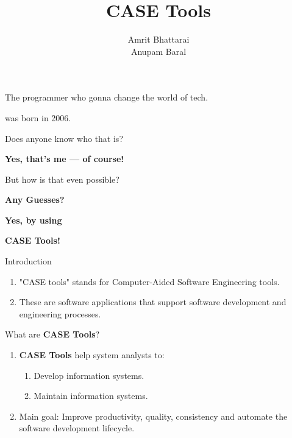 \documentclass[14pt, aspectratio=169]{beamer}
\title{CASE Tools}
\author{Amrit Bhattarai\\Anupam Baral}
\begin{document}
\maketitle

\begin{frame}[plain]{}
	\vfill
	\centering
	{\Huge The programmer who gonna change the world of tech.} \par \pause
	\vspace{1em}
	{\LARGE was born in \textcolor{alert}{2006}.} \par \pause
	\vspace{1em}
	{\large Does anyone know who that is?} \par \pause
	\vspace{1em}
	{\Huge \textbf{Yes, that’s me — of course!}}
	\vfill
\end{frame}

\begin{frame}[plain]{}
	\vfill
	\centering
	{\Huge But how is that even possible?} \par \pause
	\vspace{2em}
	{\Huge \textbf{Any Guesses?}}
	\vfill
\end{frame}

\begin{frame}[plain]{}
	\vfill
	\centering
	{\Huge \textbf{Yes, by using}} \par
	\vspace{1em}
	{\Huge \textbf{\textcolor{alert}{CASE Tools!}}}
	\vfill
\end{frame}

\begin{frame}{Introduction}
	\begin{enumerate}
		\item<1-> "CASE tools" stands for \textcolor{alert}{Computer-Aided Software Engineering} tools. \pause
		\item<2-> These are software applications that support software development and engineering processes.
	\end{enumerate}
\end{frame}


\begin{frame}{What are \textbf{CASE Tools}?}
	\begin{enumerate}
		\item<1-> \textbf{CASE Tools} help system analysts to: \pause
			\begin{enumerate}
				\item Develop information systems.
				\item Maintain information systems. \pause
			\end{enumerate}
		\item<2-> Main goal: Improve \textcolor{alert}{productivity, quality, consistency} and
			\textcolor{alert}{automate} the software development lifecycle.
	\end{enumerate}
\end{frame}
\end{document}
